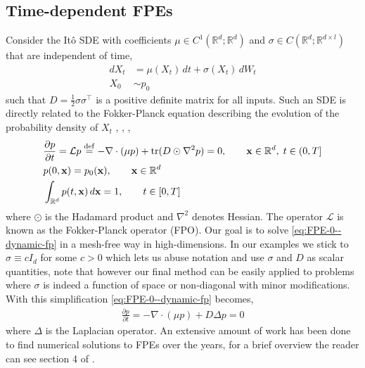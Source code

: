 \subsection{Time-dependent FPEs}
Consider the Itô SDE with coefficients $\mu\in C^1(\mathbb R^d;\mathbb R^d)$ and $\sigma\in C(\mathbb R^d; \mathbb R^{d\times l})$ that are independent of time,
\begin{equation}
\begin{aligned}
    dX_t &= \mu(X_t)\,dt + \sigma(X_t)\,dW_t\\
    X_0&\sim p_0\label{eq:SDE-0--dynamic-fp}
\end{aligned}
\end{equation}
such that $D=\frac{1}{2}\sigma\sigma^\top$ is a positive definite matrix for all inputs. Such an SDE is directly related to the Fokker-Planck equation describing the evolution of the probability density of $X_t$ \cite{risken1996fokker}, \cite{bogachev2022fokker}, \cite{bris2008existence},
\begin{equation}
\begin{aligned}
    &\frac{\partial p}{\partial t} = \mathcal Lp \stackrel{\rm def}{=}
  -\nabla \cdot(\mu p) + {\rm tr}(D\odot\nabla^2p)=0,\qquad\mathbf x\in\mathbb R^d,\; t\in(0, T]\\
  &p(0, \mathbf x) = p_0(\mathbf x),\qquad\mathbf x\in\mathbb R^d\\
  &\int_{\mathbb R^d}p(t, \mathbf x)\,d\mathbf x = 1,\qquad t\in[0, T] 
\label{eq:FPE-0--dynamic-fp}
\end{aligned}
\end{equation}
where $\odot$ is the Hadamard product and $\nabla^2$ denotes Hessian. The operator $\mathcal L$ is known as the Fokker-Planck operator (FPO). Our goal is to solve \eqref{eq:FPE-0--dynamic-fp} in a mesh-free way in high-dimensions. In our examples we stick to $\sigma \equiv cI_d$ for some $c>0$ which lets us abuse notation and use $\sigma$ and $D$ as scalar quantities, note that however our final method can be easily applied to problems where $\sigma$ is indeed a function of space or non-diagonal with minor modifications. With this simplification \eqref{eq:FPE-0--dynamic-fp} becomes,
\begin{align}
    \frac{\partial p}{\partial t}=
  -\nabla \cdot(\mu p) + D\Delta p=0\label{eq:FPE-1--dynamic-fp}
\end{align}
where $\Delta$ is the Laplacian operator. An extensive amount of work has been done to find numerical solutions to FPEs over the years, for a brief overview the reader can see section 4 of \cite{mandal2023learning}.  
